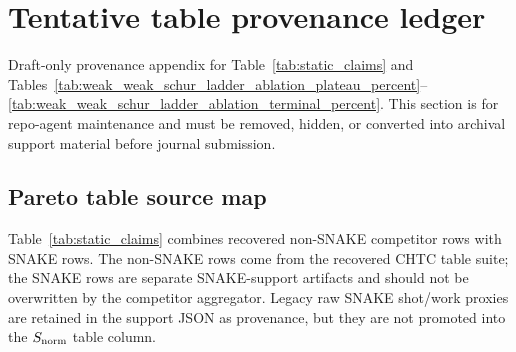 \documentclass[
  reprint,
  amsmath,
  amssymb,
  aps,
  pra,
  nofootinbib,
  superscriptaddress,
  floatfix
]{revtex4-2}
\newcommand{\tentative}[1]{\textcolor{red!70!black}{#1}}
\begin{document}
\section{Tentative table provenance ledger}
\label{app:data_ledger}

\tentative{Draft-only provenance appendix for Table~\ref{tab:static_claims} and Tables~\ref{tab:weak_weak_schur_ladder_ablation_plateau_percent}--\ref{tab:weak_weak_schur_ladder_ablation_terminal_percent}. This section is for repo-agent maintenance and must be removed, hidden, or converted into archival support material before journal submission.}

\subsection{Pareto table source map}
\label{app:table_i_source_map}

Table~\ref{tab:static_claims} combines recovered non-SNAKE competitor rows with SNAKE rows. The non-SNAKE rows come from the recovered CHTC table suite; the SNAKE rows are separate SNAKE-support artifacts and should not be overwritten by the competitor aggregator. Legacy raw SNAKE shot/work proxies are retained in the support JSON as provenance, but they are not promoted into the $S_{\rm norm}$ table column.
\end{document}
